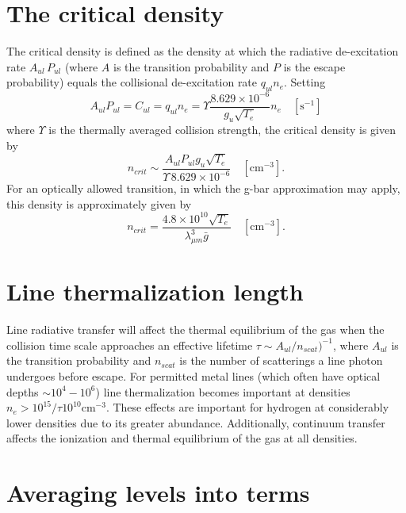 \section{The critical density }

The critical density is defined as the density at which the radiative
de-excitation rate $A_{ul}\, P_{ul}$ (where $A$ is the transition
probability and $P$
is the escape probability) equals the collisional de-excitation rate
$q_{ul}n_e$.
Setting
\begin{equation}
{A_{ul}}{P_{ul}} = {C_{ul}} = {q_{ul}}{n_e} = \Upsilon \frac{{8.629 \times
{{10}^{ - 6}}}}{{{g_u}\sqrt {{T_e}} }}{n_e}\quad
  [\mathrm{s}^{-1}]
\end{equation}
where $\Upsilon$ is the thermally averaged collision strength,
the critical density
is given by
\begin{equation}
{n_{crit}} \sim \frac{{{A_{ul}}{P_{ul}}{g_u}\sqrt {{T_e}} }}{{\Upsilon
\,8.629 \times {{10}^{ - 6}}}}\quad
  [\mathrm{cm}^{-3}].
\end{equation}
For an optically allowed transition, in which the g-bar approximation may
apply, this density is approximately given by
\begin{equation}
{n_{crit}} = \frac{{4.8 \times {{10}^{10}}\sqrt {{T_e}} }}{{\lambda _{\mu
m}^3\bar g}}\quad
[\mathrm{cm}^{-3}].
\end{equation}

\section{Line thermalization length }

Line radiative transfer will affect the thermal equilibrium of the gas
when the collision time scale approaches an effective lifetime $\tau\sim
A_{ul} /n_{scat} )^{-1}$, where $A_{ul}$ is the transition probability and
$n_{scat}$ is the number
of scatterings a line photon undergoes before escape.
For permitted metal
lines (which often have optical depths  $\sim10^4 - 10^6$) line thermalization
becomes important at densities $n_e >10^{15} / \tau 10^{10} \mathrm{cm}^{-3}$.  These effects are
important for hydrogen at considerably lower densities due to its greater
abundance.  Additionally, continuum transfer affects the ionization and
thermal equilibrium of the gas at all densities.

\section{Averaging levels into terms  }

